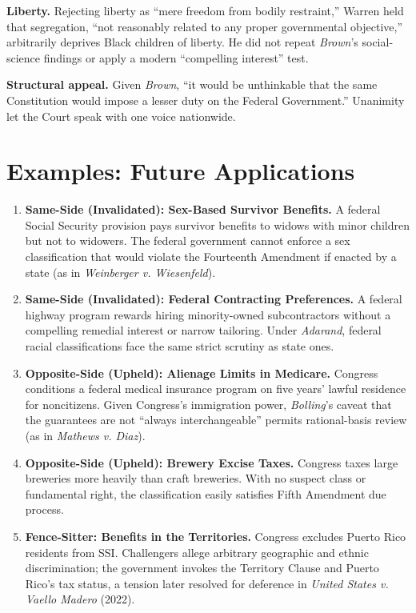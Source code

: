 \documentclass[12pt]{article}
\begin{document}
\textbf{Liberty.} Rejecting liberty as ``mere freedom from bodily restraint,'' Warren held that segregation, ``not reasonably related to any proper governmental objective,'' arbitrarily deprives Black children of liberty. He did not repeat \textit{Brown}'s social-science findings or apply a modern ``compelling interest'' test.

\textbf{Structural appeal.} Given \textit{Brown}, ``it would be unthinkable that the same Constitution would impose a lesser duty on the Federal Government.'' Unanimity let the Court speak with one voice nationwide.

\section{Examples: Future Applications}

\begin{enumerate}
\item \textbf{Same-Side (Invalidated): Sex-Based Survivor Benefits.} A federal Social Security provision pays survivor benefits to widows with minor children but not to widowers. The federal government cannot enforce a sex classification that would violate the Fourteenth Amendment if enacted by a state (as in \textit{Weinberger v. Wiesenfeld}).
\item \textbf{Same-Side (Invalidated): Federal Contracting Preferences.} A federal highway program rewards hiring minority-owned subcontractors without a compelling remedial interest or narrow tailoring. Under \textit{Adarand}, federal racial classifications face the same strict scrutiny as state ones.
\item \textbf{Opposite-Side (Upheld): Alienage Limits in Medicare.} Congress conditions a federal medical insurance program on five years' lawful residence for noncitizens. Given Congress's immigration power, \textit{Bolling}'s caveat that the guarantees are not ``always interchangeable'' permits rational-basis review (as in \textit{Mathews v. Diaz}).
\item \textbf{Opposite-Side (Upheld): Brewery Excise Taxes.} Congress taxes large breweries more heavily than craft breweries. With no suspect class or fundamental right, the classification easily satisfies Fifth Amendment due process.
\item \textbf{Fence-Sitter: Benefits in the Territories.} Congress excludes Puerto Rico residents from SSI. Challengers allege arbitrary geographic and ethnic discrimination; the government invokes the Territory Clause and Puerto Rico's tax status, a tension later resolved for deference in \textit{United States v. Vaello Madero} (2022).
\end{enumerate}
\end{document}
